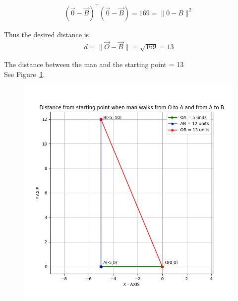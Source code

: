 \documentclass[14pt, a4paper]{extarticle}
\begin{document}
\begin{align}
    (\vec{0} - \vec{B})^\top(\vec{0} - \vec{B}) = 169 = \|0 - B\|^2
\end{align}

Thus the desired distance is
\begin{align}
    d = \|\vec{O} - \vec{B}\| = \sqrt{169} = 13
\end{align}

The distance between the man and the starting point = 13 \\

See Figure~\ref{fig:pathofman}.

\begin{figure}[h!]
    \centering
    \includegraphics[width=0.8\linewidth]{figs/fig2.png}
    \caption{}
    \label{fig:pathofman}
\end{figure}
\end{document}
